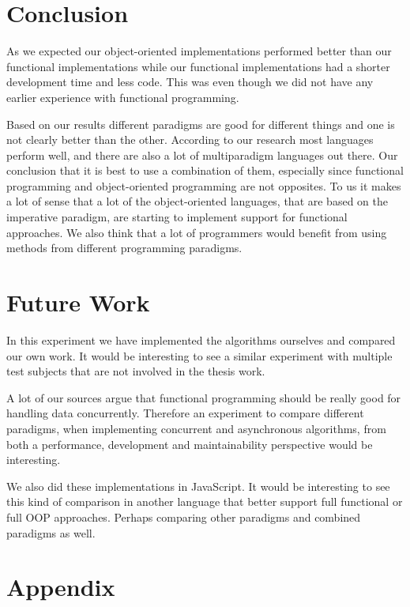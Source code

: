 \documentclass {article}
\begin{document}
\section{Conclusion}
As we expected our object-oriented implementations performed better than our functional implementations while our functional implementations had a shorter development time and less code. This was even though we did not have any earlier experience with functional programming.  

Based on our results different paradigms are good for different things and one is not clearly better than the other. According to our research most languages perform well, and there are also a lot of multiparadigm languages out there. Our conclusion that it is best to use a combination of them, especially since functional programming and object-oriented programming are not opposites. To us it makes a lot of sense that a lot of the object-oriented languages, that are based on the imperative paradigm, are starting to implement support for functional approaches. We also think that a lot of programmers would benefit from using methods from different programming paradigms.

\section{Future Work}
In this experiment we have implemented the algorithms ourselves and compared our own work. It would be interesting to see a similar experiment with multiple test subjects that are not involved in the thesis work. 

A lot of our sources argue that functional programming should be really good for handling data concurrently. Therefore an experiment to compare different paradigms,  when implementing concurrent and asynchronous algorithms, from both a performance, development and maintainability perspective would be interesting. 

We also did these implementations in JavaScript. It would be interesting to see this kind of comparison in another language that better support full functional or full OOP approaches. Perhaps comparing other paradigms and combined paradigms as well.



\appendix
\section{Appendix}
\label{appendix:test-cases}
\end{document}
